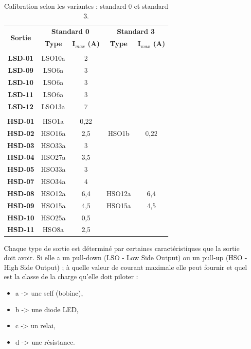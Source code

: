 \begin{table}[H]
\centering
\caption{Calibration selon les variantes : standard 0 et standard 3.}
\label{tab:calibration-selon-variantes}
\begin{tabular}{|c|c|c|c|c|}
\hline
 \multirow{2}{4em}{\textbf{ Sortie }} & \multicolumn{2}{|c|}{ \textbf{ Standard 0 }} & \multicolumn{2}{|c|}{ \textbf{ Standard 3 }} \\
\cline{2-5}
 & \textbf{ Type } & \textbf{ I$_{max}$ (A) } & \textbf{ Type } & \textbf{ I$_{max}$ (A) }  \\
 \hline
 & & & & \\
\hline
 \textbf{LSD-01} & LSO10a & 2 & & \\
\hline
 \textbf{LSD-09} & LSO6a & 3 & & \\
\hline
 \textbf{LSD-10} & LSO6a & 3 & & \\
\hline
 \textbf{LSD-11} & LSO6a & 3 & & \\
\hline
 \textbf{LSD-12} & LSO13a & 7 & & \\
\hline
 & & & & \\
\hline
 \textbf{HSD-01} & HSO1a & 0,22 & & \\
\hline
 \textbf{HSD-02} & HSO16a & 2,5 & HSO1b & 0,22 \\
\hline
 \textbf{HSD-03} & HSO33a & 3 & & \\
\hline
 \textbf{HSD-04} & HSO27a & 3,5 & & \\
\hline
 \textbf{HSD-05} & HSO33a & 3 & & \\
\hline
 \textbf{HSD-07} & HSO34a & 4 & & \\
\hline
 \textbf{HSD-08} & HSO12a & 6,4 & HSO12a & 6,4 \\
\hline
 \textbf{HSD-09} & HSO15a & 4,5 & HSO15a & 4,5 \\
\hline
 \textbf{HSD-10} & HSO25a & 0,5 & & \\
\hline
 \textbf{HSD-11} & HSO8a & 2,5 & & \\
\hline
\end{tabular}
\end{table}

Chaque type de sortie est déterminé par certaines caractéristiques que la sortie doit avoir. Si elle a un pull-down (LSO - Low Side Output) ou un pull-up (HSO - High Side Output) ; à quelle valeur de courant maximale elle peut fournir et quel est la classe de la charge qu'elle doit piloter :

\begin{itemize}
\item a -> une self (bobine),
\item b -> une diode LED,
\item c -> un relai,
\item d -> une résistance.
\end{itemize} 

